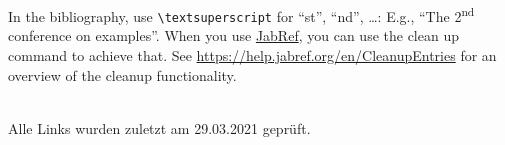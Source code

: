 \documentclass[runningheads,a4paper,ngerman]{llncs}[2022/01/12]
\begin{document}

In the bibliography, use \texttt{\textbackslash textsuperscript} for \enquote{st}, \enquote{nd}, \ldots:
E.g., \enquote{The 2\textsuperscript{nd} conference on examples}.
When you use \href{https://www.jabref.org}{JabRef}, you can use the clean up command to achieve that.
See \url{https://help.jabref.org/en/CleanupEntries} for an overview of the cleanup functionality.

\renewcommand{\bibsection}{\section*{Literatur}} %

\begingroup
  \small %
  
\endgroup

\ \\
%
\noindent
Alle Links wurden zuletzt am 29.03.2021 geprüft.



\end{document}
